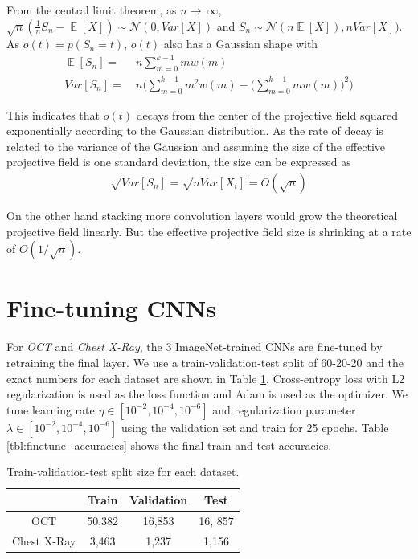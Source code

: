 From the central limit theorem, as $n \rightarrow~\infty$, $\sqrt{n}(\frac{1}{n}S_n - \mathop{\mathbb{E}}[X]) \sim \mathcal{N}(0, Var[X])$ and $S_n \sim \mathcal{N}(n\mathop{\mathbb{E}}[X]), nVar[X])$.
As $o(t) = p(S_n=t)$, $o(t)$ also has a Gaussian shape with
\begin{align}
	\mathop{\mathbb{E}}[S_n] =&~ n\sum_{m=0}^{k-1}mw(m)\\
	Var[S_n] =&~ n \Bigg(\sum_{m=0}^{k-1}m^2w(m) - \Big(\sum_{m=0}^{k-1}mw(m)\Big)^2 \Bigg)
\end{align}

This indicates that $o(t)$ decays from the center of the projective field squared exponentially according to the Gaussian distribution.
As the rate of decay is related to the variance of the Gaussian and assuming the size of the effective projective field is one standard deviation, the size can be expressed as
\begin{align}
	\sqrt{Var[S_n]} = \sqrt{nVar[X_i]} = O(\sqrt{n})
\end{align}

On the other hand stacking more convolution layers would grow the theoretical projective field linearly. But the effective projective field size is shrinking at a rate of $O(1/\sqrt{n})$.



\section{Fine-tuning CNNs}

For \textit{OCT} and \textit{Chest X-Ray}, the 3 ImageNet-trained CNNs are fine-tuned by retraining the final layer.
We use a train-validation-test split of 60-20-20 and the exact numbers for each dataset are shown in Table \ref{tbl:dataset_sizes}.
Cross-entropy loss with L2 regularization is used as the loss function and  Adam \cite{kingma2014adam} is used as the optimizer.
We tune learning rate $\eta \in [10^{-2}, 10^{-4}, 10^{-6}]$ and regularization parameter $\lambda \in [10^{-2}, 10^{-4}, 10^{-6}]$ using the validation set and train for 25 epochs.
Table \ref{tbl:finetune_accuracies} shows the final train and test accuracies.

\begin{table}[ht]
\begin{tabular}{cccc}
 & Train & Validation & Test \\ \hline
\hline
OCT & 50,382 & 16,853 & 16, 857 \\ \hline
Chest X-Ray & 3,463 & 1,237 & 1,156 \\ \hline
\end{tabular}
\caption{Train-validation-test split size for each dataset.}
\vspace{-6mm}
\label{tbl:dataset_sizes}
\end{table}


